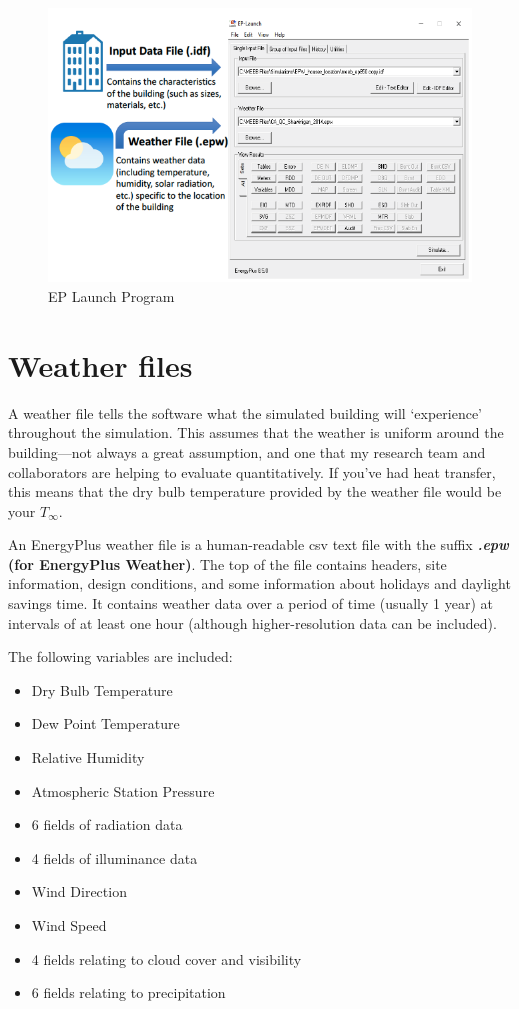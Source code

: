 \documentclass[10pt]{article}
\begin{document}
            \begin{figure}[h]
            \centering
            \includegraphics[width=5in]{extras08/EPinterface.png}
            \caption{EP Launch Program \cite{Bianchi-dissertation}}
            \label{EPlaunch}
            \end{figure}




\section{Weather files}

A weather file tells the software what the simulated building will `experience' throughout the simulation. This assumes that the weather is uniform around the building---not always a great assumption, and one that my research team and collaborators are helping to evaluate quantitatively. If you've had heat transfer, this means that the dry bulb temperature provided by the weather file would be your $T_\infty$. 

An EnergyPlus weather file is a human-readable csv text file with the suffix \textbf{\textit{.epw} (for EnergyPlus Weather)}. The top of the file contains headers, site information, design conditions, and some information about holidays and daylight savings time. It contains weather data over a period of time (usually 1 year) at intervals of at least one hour (although higher-resolution data can be included). 


The following variables are included:
\begin{itemize}
    \setlength{\itemsep}{0pt}%
    \setlength{\parskip}{0pt}%
    \item Dry Bulb Temperature
    \item Dew Point Temperature
    \item  Relative Humidity
    \item  Atmospheric Station Pressure
    \item 6 fields of radiation data
    \item 4 fields of illuminance data
    \item Wind Direction
    \item  Wind Speed
    \item 4 fields relating to cloud cover and visibility
    \item 6 fields relating to precipitation
\end{itemize}
\end{document}
